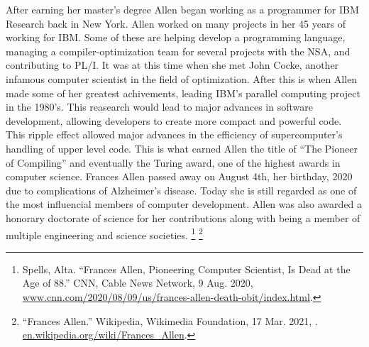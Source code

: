 \documentclass{article}
\begin{document}
After earning her master's degree Allen began working as a programmer for IBM Research back in New York. Allen worked on many projects in her 45 years of working for IBM. Some of these are helping develop a programming language, managing a compiler-optimization team for several projects with the NSA, and contributing to PL/I. It was at this time when she met John Cocke, another infamous computer scientist in the field of optimization. After this is when Allen made some of her greatest achivements, leading IBM's parallel computing project in the 1980's. This reasearch would lead to major advances in software development, allowing developers to create more compact and powerful code. This ripple effect allowed major advances in the efficiency of supercomputer's handling of upper level code. This is what earned Allen the title of ``The Pioneer of Compiling'' and eventually the Turing award, one of the highest awards in computer science. Frances Allen passed away on August 4th, her birthday, 2020 due to complications of Alzheimer's disease. Today she is still regarded as one of the most influencial members of computer development. Allen was also awarded a honorary doctorate of science for her contributions along with being a member of multiple engineering and science societies. \footnote{Spells, Alta. “Frances Allen, Pioneering Computer Scientist, Is Dead at the Age of 88.” CNN, Cable News Network, 9 Aug. 2020, \url{www.cnn.com/2020/08/09/us/frances-allen-death-obit/index.html}.} \footnote{“Frances Allen.” Wikipedia, Wikimedia Foundation, 17 Mar. 2021, .  \url{en.wikipedia.org/wiki/Frances_Allen}.}

% 
% 
\end{document}
